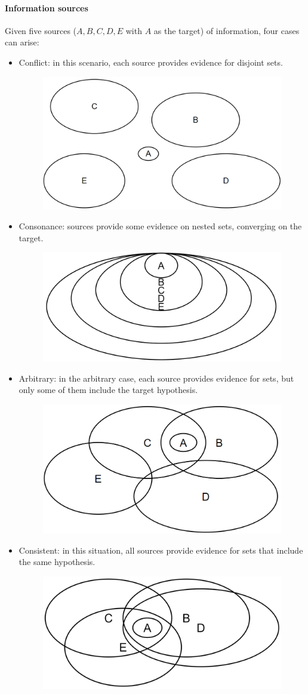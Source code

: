 \paragraph*{Information sources}
Given five sources ($A, B, C, D, E$ with $A$ as the target) of information, four cases can arise:
\begin{itemize}
    \item Conflict: in this scenario, each source provides evidence for disjoint sets.
        \begin{figure}[H]
            \centering
            \includegraphics[width=0.5\linewidth]{images/conflict.png}
        \end{figure}
    \item Consonance: sources provide some evidence on nested sets, converging on the target.
        \begin{figure}[H]
            \centering
            \includegraphics[width=0.5\linewidth]{images/consonance.png}
        \end{figure}
    \item Arbitrary: in the arbitrary case, each source provides evidence for sets, but only some of them include the target hypothesis.
        \begin{figure}[H]
            \centering
            \includegraphics[width=0.5\linewidth]{images/arbitrary.png}
        \end{figure}
    \item Consistent: in this situation, all sources provide evidence for sets that include the same hypothesis.
        \begin{figure}[H]
            \centering
            \includegraphics[width=0.5\linewidth]{images/consistent.png}
        \end{figure}
\end{itemize}

